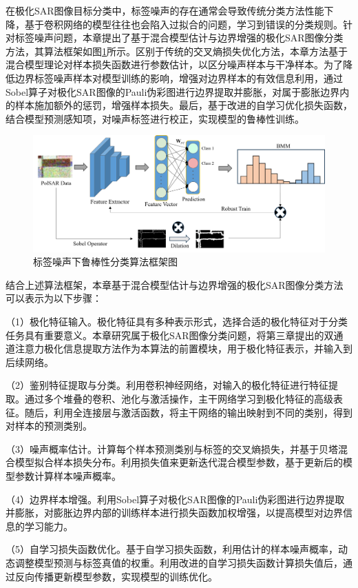 在极化SAR图像目标分类中，标签噪声的存在通常会导致传统分类方法性能下降，基于卷积网络的模型往往也会陷入过拟合的问题，学习到错误的分类规则。针对标签噪声问题，本章提出了基于混合模型估计与边界增强的极化SAR图像分类方法，其算法框架如图\ref{BBM_framework}所示。区别于传统的交叉熵损失优化方法，本章方法基于混合模型理论对样本损失函数进行参数估计，以区分噪声样本与干净样本。为了降低边界标签噪声样本对模型训练的影响，增强对边界样本的有效信息利用，通过Sobel算子对极化SAR图像的Pauli伪彩图进行边界提取并膨胀，对属于膨胀边界内的样本施加额外的惩罚，增强样本损失。最后，基于改进的自学习优化损失函数，结合模型预测感知项，对噪声标签进行校正，实现模型的鲁棒性训练。

\begin{figure}[h]
  \centering
  \includegraphics[width=14cm]{pic/chapter4/framework.png}
  \caption{标签噪声下鲁棒性分类算法框架图}
  \label{BBM_framework}
\end{figure}

结合上述算法框架，本章基于混合模型估计与边界增强的极化SAR图像分类方法可以表示为以下步骤：

（1）极化特征输入。极化特征具有多种表示形式，选择合适的极化特征对于分类任务具有重要意义。本章研究属于极化SAR图像分类问题，将第三章提出的双通道注意力极化信息提取方法作为本算法的前置模块，用于极化特征表示，并输入到后续网络。

（2）鉴别特征提取与分类。利用卷积神经网络，对输入的极化特征进行特征提取。通过多个堆叠的卷积、池化与激活操作，主干网络学习到极化特征的高级表征。随后，利用全连接层与激活函数，将主干网络的输出映射到不同的类别，得到对样本的预测类别。

（3）噪声概率估计。计算每个样本预测类别与标签的交叉熵损失，并基于贝塔混合模型拟合样本损失分布。利用损失值来更新迭代混合模型参数，基于更新后的模型参数计算样本噪声概率。

（4）边界样本增强。利用Sobel算子对极化SAR图像的Pauli伪彩图进行边界提取并膨胀，对膨胀边界内部的训练样本进行损失函数加权增强，以提高模型对边界信息的学习能力。

（5）自学习损失函数优化。基于自学习损失函数，利用估计的样本噪声概率，动态调整模型预测与标签真值的权重。利用改进的自学习损失函数计算损失值后，通过反向传播更新模型参数，实现模型的训练优化。


